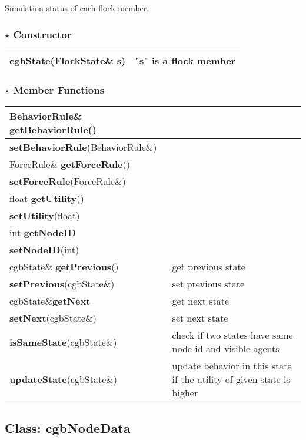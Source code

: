 \documentclass[onecolumn,10pt]{article}
\begin{document}
Simulation status of each flock member.

\subsubsection*{$\star$ Constructor}
\begin{tabular}{|l|l|}\hline
{\bf cgbState}(FlockState\& s) & "s" is a flock member\\\hline
\end{tabular}

\subsubsection*{$\star$ Member Functions}

\begin{tabular}{|l|l|} \hline
BehaviorRule\& {\bf getBehaviorRule}()    &  \\\hline
{\bf setBehaviorRule}(BehaviorRule\&)     &  \\\hline 
ForceRule\& {\bf getForceRule}() &  \\\hline
{\bf setForceRule}(ForceRule\&)  &  \\\hline
float {\bf getUtility}()    &  \\\hline
{\bf setUtility}(float)    &  \\\hline
int {\bf getNodeID}     &  \\\hline
{\bf setNodeID}(int)     &  \\\hline
cgbState\& {\bf getPrevious}() & get previous state \\\hline
{\bf setPrevious}(cgbState\&)  & set previous state  \\\hline
cgbState\&{\bf getNext}        & get next state \\\hline
{\bf setNext}(cgbState\&)      & set next state \\\hline
{\bf isSameState}(cgbState\&)  & check if two states have same node id and visible agents \\\hline
{\bf updateState}(cgbState\&)  & update behavior in this state if the utility of given state is higher \\\hline
\end{tabular}


\subsection{Class: cgbNodeData}
\label{subsec:cgbNodeData}
\end{document}
